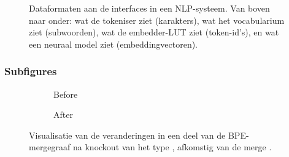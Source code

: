 \begin{figure}[H]
\begin{mdframed}[backgroundcolor=black!5]
\begin{adjustwidth}{0cm}{-1cm}
{
}
\end{adjustwidth}
\end{mdframed}
\caption[Dataformaten aan de interfaces in een NLP-systeem.]{Dataformaten aan de interfaces in een NLP-systeem. Van boven naar onder: wat de tokeniser ziet (karakters), wat het vocabularium ziet (subwoorden), wat de embedder-LUT ziet (token-id's), en wat een neuraal model ziet (embeddingvectoren).}
\label{fig:interfaces}
\end{figure}

\subsubsection{Subfigures}
\begin{figure}[h]
	\hspace{-1em}
	\begin{subfigure}{0.5\linewidth}
		\caption{Before}
	\end{subfigure}
	\hspace{2em}
	\begin{subfigure}{0.5\linewidth}
		\caption{After}
	\end{subfigure}
	\caption[Visualisatie van BPE-knockout]{Visualisatie van de veranderingen in een deel van de BPE-mergegraaf na knockout van het type , afkomstig van de merge .}
	\label{fig:knockout}
\end{figure}


